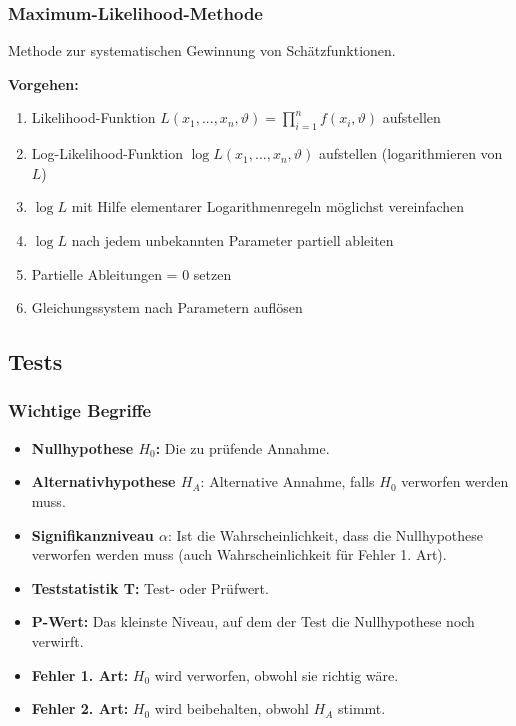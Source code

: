 \documentclass[10pt,a4paper,twocolumn]{article}
\begin{document}
\subsubsection{Maximum-Likelihood-Methode}
Methode zur systematischen Gewinnung von Schätzfunktionen.

\vspace{10pt}

\textbf{Vorgehen:}
\begin{enumerate}
\item Likelihood-Funktion $L(x_1,...,x_n,\vartheta)= \prod \limits_{i=1}^{n} f(x_i,\vartheta)$ aufstellen
\item Log-Likelihood-Funktion $\log L(x_1,...,x_n,\vartheta)$ aufstellen (logarithmieren von $L$)
\item $\log L$ mit Hilfe elementarer Logarithmenregeln möglichst vereinfachen
\item $\log L$ nach jedem unbekannten Parameter partiell ableiten
\item Partielle Ableitungen = 0 setzen
\item Gleichungssystem nach Parametern auflösen
\end{enumerate}

\subsection{Tests}

\subsubsection{Wichtige Begriffe}

\begin{itemize}
\item \textbf{Nullhypothese $H_0$:} Die zu prüfende Annahme.
\item \textbf{Alternativhypothese $H_A$}: Alternative Annahme, falls $H_0$ verworfen werden muss.
\item \textbf{Signifikanzniveau $\alpha$}: Ist die Wahrscheinlichkeit, dass die Nullhypothese verworfen werden muss (auch Wahrscheinlichkeit für Fehler 1. Art).
\item \textbf{Teststatistik T:} Test- oder Prüfwert.
\item \textbf{P-Wert:} Das kleinste Niveau, auf dem der Test die Nullhypothese noch verwirft.
\item \textbf{Fehler 1. Art:} $H_0$ wird verworfen, obwohl sie richtig wäre.
\item \textbf{Fehler 2. Art:} $H_0$ wird beibehalten, obwohl $H_A$ stimmt.
\end{itemize}
\end{document}

